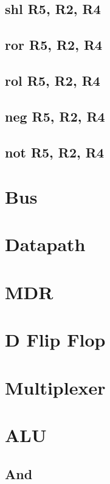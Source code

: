 \documentclass{article}
\begin{document}
    \subsection{shl R5, R2, R4}
    \subsection{ror R5, R2, R4}
    \subsection{rol R5, R2, R4}
    \subsection{neg R5, R2, R4}
    \subsection{not R5, R2, R4}

\appendix
% 
\section{Bus}

\section{Datapath}

\section{MDR}

\section{D Flip Flop}

\section{Multiplexer}

\section{ALU}

\subsection{And}
\end{document}
